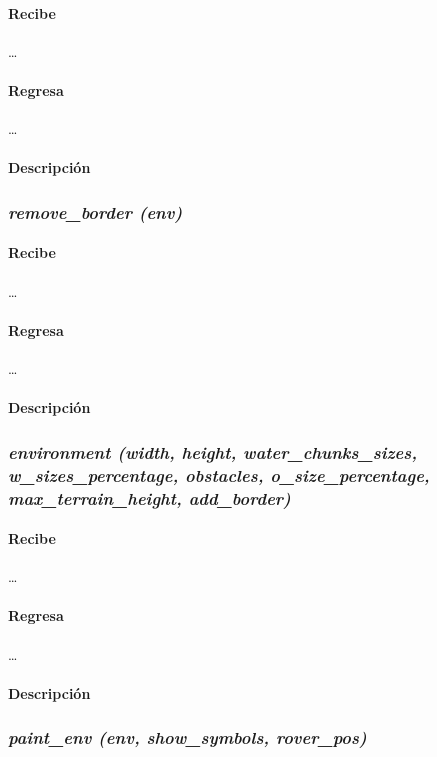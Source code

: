 \documentclass[12pt, letterpaper]{article}
\begin{document}
            \paragraph{Recibe}
            \dots
            \paragraph{Regresa}
            \dots
            \paragraph{Descripción}

        \subsubsection{\textit{remove\_border (env)}}

            \paragraph{Recibe}
            \dots
            \paragraph{Regresa}
            \dots
            \paragraph{Descripción}

        \subsubsection{\textit{environment (width, height, water\_chunks\_sizes, w\_sizes\_percentage, obstacles, o\_size\_percentage, max\_terrain\_height, add\_border)}}

            \paragraph{Recibe}
            \dots
            \paragraph{Regresa}
            \dots
            \paragraph{Descripción}

        \subsubsection{\textit{paint\_env (env, show\_symbols, rover\_pos)}}
\end{document}
